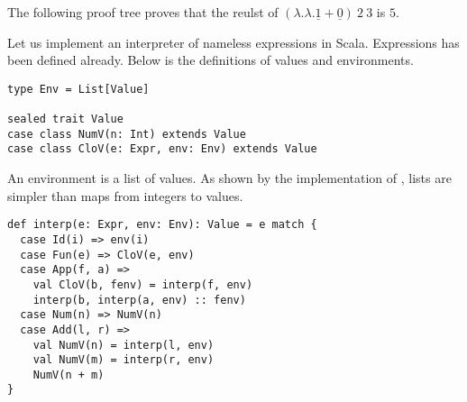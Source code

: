 The following proof tree proves that the reulst of
$(\lambda.\lambda.\underline{1}+\underline{0})\ 2\ 3$ is $5$.





Let us implement an interpreter of nameless expressions in Scala. Expressions has
been defined already. Below is the definitions of values and environments.

\begin{verbatim}
type Env = List[Value]

sealed trait Value
case class NumV(n: Int) extends Value
case class CloV(e: Expr, env: Env) extends Value
\end{verbatim}

An environment is a list of values. As shown by the implementation of
, lists are simpler than maps from integers to values.

\begin{verbatim}
def interp(e: Expr, env: Env): Value = e match {
  case Id(i) => env(i)
  case Fun(e) => CloV(e, env)
  case App(f, a) =>
    val CloV(b, fenv) = interp(f, env)
    interp(b, interp(a, env) :: fenv)
  case Num(n) => NumV(n)
  case Add(l, r) =>
    val NumV(n) = interp(l, env)
    val NumV(m) = interp(r, env)
    NumV(n + m)
}
\end{verbatim}

